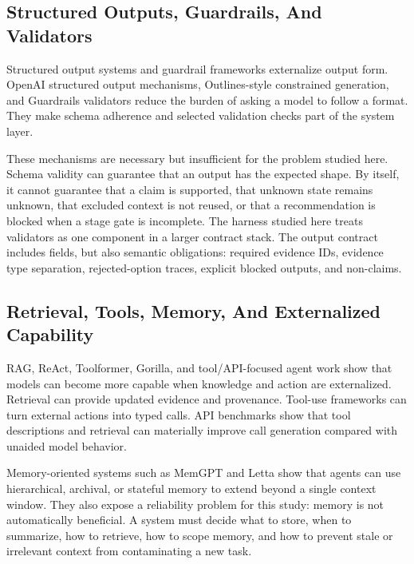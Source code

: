 \documentclass[11pt]{article}
\begin{document}
\subsection{Structured Outputs, Guardrails, And Validators}

Structured output systems and guardrail frameworks externalize output form. OpenAI structured output mechanisms, Outlines-style constrained generation, and Guardrails validators reduce the burden of asking a model to follow a format. They make schema adherence and selected validation checks part of the system layer. \cite{P2_EXT_OPENAI_STRUCTURED_OUTPUTS,P2_EXT_OUTLINES,P2_EXT_GUARDRAILS}

These mechanisms are necessary but insufficient for the problem studied here. Schema validity can guarantee that an output has the expected shape. By itself, it cannot guarantee that a claim is supported, that unknown state remains unknown, that excluded context is not reused, or that a recommendation is blocked when a stage gate is incomplete. The harness studied here treats validators as one component in a larger contract stack. The output contract includes fields, but also semantic obligations: required evidence IDs, evidence type separation, rejected-option traces, explicit blocked outputs, and non-claims.

\subsection{Retrieval, Tools, Memory, And Externalized Capability}

RAG, ReAct, Toolformer, Gorilla, and tool/API-focused agent work show that models can become more capable when knowledge and action are externalized. Retrieval can provide updated evidence and provenance. Tool-use frameworks can turn external actions into typed calls. API benchmarks show that tool descriptions and retrieval can materially improve call generation compared with unaided model behavior. \cite{P2_EXT_RAG,P2_EXT_REACT,P2_EXT_TOOLFORMER,P2_EXT_GORILLA}

Memory-oriented systems such as MemGPT and Letta show that agents can use hierarchical, archival, or stateful memory to extend beyond a single context window. They also expose a reliability problem for this study: memory is not automatically beneficial. A system must decide what to store, when to summarize, how to retrieve, how to scope memory, and how to prevent stale or irrelevant context from contaminating a new task. \cite{P2_EXT_MEMGPT,P2_EXT_LETTA}
\end{document}
